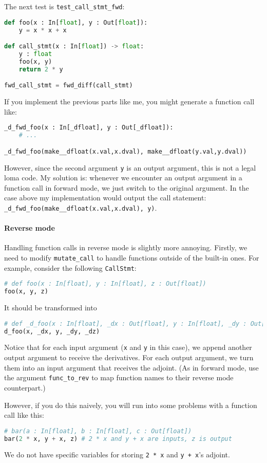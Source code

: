 The next test is \lstinline{test_call_stmt_fwd}:
\begin{lstlisting}[language=Python]
def foo(x : In[float], y : Out[float]):
    y = x * x + x

def call_stmt(x : In[float]) -> float:
    y : float
    foo(x, y)
    return 2 * y

fwd_call_stmt = fwd_diff(call_stmt)
\end{lstlisting}
If you implement the previous parts like me, you might generate a function call like:
\begin{lstlisting}[language=Python]
_d_fwd_foo(x : In[_dfloat], y : Out[_dfloat]):
    # ...

_d_fwd_foo(make__dfloat(x.val,x.dval), make__dfloat(y.val,y.dval))
\end{lstlisting}
However, since the second argument \lstinline{y} is an output argument, this is not a legal loma code. My solution is: whenever we encounter an output argument in a function call in forward mode, we just switch to the original argument. In the case above my implementation would output the call statement: \lstinline{_d_fwd_foo(make__dfloat(x.val,x.dval), y)}.

\paragraph{Reverse mode} Handling function calls in reverse mode is slightly more annoying. Firstly, we need to modify \lstinline{mutate_call} to handle functions outside of the built-in ones. For example, consider the following \lstinline{CallStmt}:
\begin{lstlisting}[language=Python]
# def foo(x : In[float], y : In[float], z : Out[float])
foo(x, y, z)
\end{lstlisting}
It should be transformed into
\begin{lstlisting}[language=Python]
# def _d_foo(x : In[float], _dx : Out[float], y : In[float], _dy : Out[float], _dz : In[float])
d_foo(x, _dx, y, _dy, _dz)
\end{lstlisting}
Notice that for each input argument (\lstinline{x} and \lstinline{y} in this case), we append another output argument to receive the derivatives. For each output argument, we turn them into an input argument that receives the adjoint.
(As in forward mode, use the argument \lstinline{func_to_rev} to map function names to their reverse mode 
counterpart.)

However, if you do this naively, you will run into some problems with a function call like this:
\begin{lstlisting}[language=Python]
# bar(a : In[float], b : In[float], c : Out[float])
bar(2 * x, y + x, z) # 2 * x and y + x are inputs, z is output
\end{lstlisting}
We do not have specific variables for storing \lstinline{2 * x} and \lstinline{y + x}'s adjoint. 

